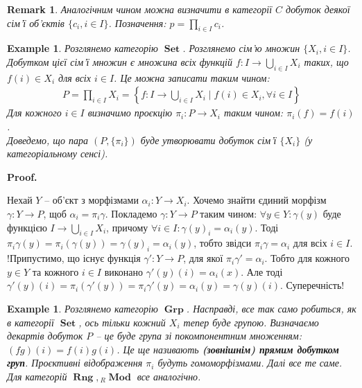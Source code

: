 \documentclass[a4paper, 10pt]{article}
\makeatletter
\theoremstyle{theoremdd}
\newtheorem{example}[theorem]{Example}
\newtheorem{remark}[theorem]{Remark}
\renewenvironment{proof}[1][Proof.\\]{\par
\pushQED{\hfill \qed}%
\normalfont \topsep6\p@\@plus6\p@\relax
\trivlist
\item\relax
{\bfseries
#1\@addpunct{.}}\hspace\labelsep\ignorespaces
}{%
\popQED\endtrivlist\@endpefalse
}
\DeclareMathOperator{\Set}{\textbf{Set}}
\DeclareMathOperator{\Grp}{\textbf{Grp}}
\DeclareMathOperator{\Rng}{\textbf{Rng}}
\DeclareMathOperator{\Mod}{\textbf{Mod}}
\makeatother
\begin{document}
\begin{remark}
Аналогічним чином можна визначити в категорії $C$ добуток деякої сім'ї об'єктів $\{c_i, i \in I\}$. Позначення: $p = \displaystyle\prod_{i \in I} c_i$.
\end{remark}

\begin{example}
Розглянемо категорію $\Set$. Розглянемо сім'ю множин $\{X_i,i \in I\}$. Добутком цієї сім'ї множин є множина всіх функцій $f \colon I \to \displaystyle\bigcup_{i \in I} X_i$ таких, що $f(i) \in X_i$ для всіх $i \in I$. Це можна записати таким чином:
\begin{align*}
P = \prod_{i \in I} X_i = \left\{ f \colon I \to \bigcup_{i \in I} X_i \mid f(i) \in X_i, \forall i \in I \right\}
\end{align*}
Для кожного $i \in I$ визначимо проєкцію $\pi_i \colon P \to X_i$ таким чином: $\pi_i(f) = f(i)$.\\
Доведемо, що пара $(P,\{\pi_i\})$ буде утворювати добуток сім'ї $\{X_i\}$ (у категоріальному сенсі).
\end{example}

\begin{proof}
Нехай $Y$ -- об'єкт з морфізмами $\alpha_i \colon Y \to X_i$. Хочемо знайти єдиний морфізм $\gamma \colon Y \to P$, щоб $\alpha_i = \pi_i \gamma$. Покладемо $\gamma \colon Y \to P$ таким чином: $\forall y \in Y: \gamma(y)$ буде функцією $I \to \displaystyle\bigcup_{i \in I} X_i$, причому $\forall i \in I: \gamma(y)_i = \alpha_i(y)$. Тоді $\pi_i \gamma(y) = \pi_i(\gamma(y)) = \gamma(y)_i = \alpha_i(y)$, тобто звідси $\pi_i \gamma = \alpha_i$ для всіх $i \in I$.\\
!Припустимо, що існує функція $\gamma' \colon Y \to P$, для якої $\pi_i \gamma' = \alpha_i$. Тобто для кожного $y \in Y$ та кожного $i \in I$ виконано $\gamma'(y)(i) = \alpha_i(x)$. Але тоді $\gamma'(y)(i) = \pi_i(\gamma'(y)) = \pi_i \gamma'(y) = \alpha_i(y) = \gamma(y)(i)$. Суперечність!
\end{proof}

\begin{example}
Розглянемо категорію $\Grp$. Насправді, все так само робиться, як в категорії $\Set$, ось тільки кожний $X_i$ тепер буде групою. Визначаємо декартів добуток $P$ -- це буде група зі покомпонентним множенням: $(fg)(i) = f(i)g(i)$. Це ще називають \textbf{(зовнішнім) прямим добутком груп}. Проєктивні відображення $\pi_i$ будуть гомоморфізмами. Далі все те саме.
\bigskip \\
Для категорій $\Rng, {}_R \Mod$ все аналогічно.
\end{example}
\end{document}
